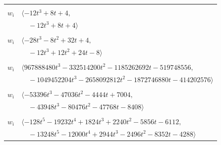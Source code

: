\documentclass[11pt]{article}
\begin{document}
\begin{longtable}{@{}ll@{}}
\addlinespace[2pt]
\multicolumn{2}{@{}p{0.97\textwidth}@{}}{$i=5$, $D_i=4$, $\rho_{ij}$: $2{:}1, \allowbreak 7{:}1, \allowbreak 27{:}2, \allowbreak 28{:}1, \allowbreak 40{:}2, \allowbreak 45{:}2, \allowbreak 50{:}2$}\\
$w_i$ & $\langle -12t^{3}+8t+4,$\\
 & $\quad -12t^{3}+8t+4\rangle$\\
\addlinespace[2pt]
\multicolumn{2}{@{}p{0.97\textwidth}@{}}{$i=6$, $D_i=4$, $\rho_{ij}$: $7{:}1, \allowbreak 19{:}2, \allowbreak 43{:}2, \allowbreak 44{:}1, \allowbreak 54{:}2$}\\
$w_i$ & $\langle -28t^{3}-8t^{2}+32t+4,$\\
 & $\quad -12t^{3}+12t^{2}+24t-8\rangle$\\
\addlinespace[2pt]
\multicolumn{2}{@{}p{0.97\textwidth}@{}}{$i=7$, $D_i=32768$, $\rho_{ij}$: $3{:}1, \allowbreak 5{:}2, \allowbreak 6{:}2, \allowbreak 8{:}2, \allowbreak 9{:}2, \allowbreak 15{:}2, \allowbreak 19{:}1, \allowbreak 21{:}2, \allowbreak 26{:}1, \allowbreak 30{:}2, \allowbreak 36{:}2, \allowbreak 39{:}1, \allowbreak 40{:}1, \allowbreak 45{:}1, \allowbreak 50{:}2, \allowbreak 59{:}1$}\\
$w_i$ & $\langle 967888480t^{3}-332514200t^{2}-1185262692t-519748556,$\\
 & $\quad -1049452204t^{3}-2658092812t^{2}-1872746880t-414202576\rangle$\\
\addlinespace[2pt]
\multicolumn{2}{@{}p{0.97\textwidth}@{}}{$i=8$, $D_i=128$, $\rho_{ij}$: $0{:}2, \allowbreak 3{:}2, \allowbreak 7{:}1, \allowbreak 11{:}2, \allowbreak 29{:}1, \allowbreak 30{:}2, \allowbreak 31{:}1, \allowbreak 33{:}1, \allowbreak 35{:}1, \allowbreak 44{:}2, \allowbreak 46{:}1$}\\
$w_i$ & $\langle -53396t^{3}-47036t^{2}-4444t+7004,$\\
 & $\quad -43948t^{3}-80476t^{2}-47768t-8408\rangle$\\
\addlinespace[2pt]
\multicolumn{2}{@{}p{0.97\textwidth}@{}}{$i=9$, $D_i=32$, $\rho_{ij}$: $1{:}2, \allowbreak 3{:}1, \allowbreak 7{:}1, \allowbreak 10{:}1, \allowbreak 11{:}2, \allowbreak 12{:}1, \allowbreak 15{:}1, \allowbreak 18{:}2, \allowbreak 27{:}2, \allowbreak 32{:}1, \allowbreak 37{:}1, \allowbreak 39{:}2, \allowbreak 40{:}2, \allowbreak 43{:}1, \allowbreak 45{:}1, \allowbreak 58{:}1$}\\
$w_i$ & $\langle -128t^{5}-19232t^{4}+1824t^{3}+2240t^{2}-5856t-6112,$\\
 & $\quad -13248t^{5}-12000t^{4}+2944t^{3}-2496t^{2}-8352t-4288\rangle$\\

\end{longtable}
\end{document}
